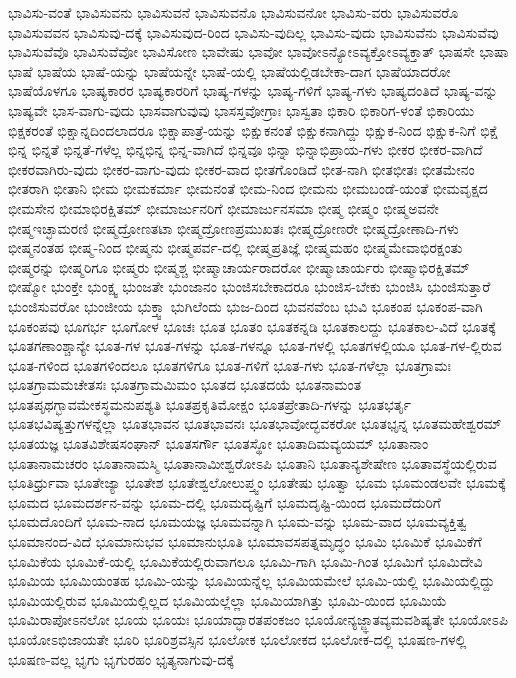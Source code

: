 {ಭಾವಿಸು-ವಂತೆ
ಭಾವಿಸುವನು
ಭಾವಿಸುವನೆ
ಭಾವಿಸುವನೊ
ಭಾವಿಸುವನೋ
ಭಾವಿಸು-ವರು
ಭಾವಿಸುವರೊ
ಭಾವಿಸುವವನ
ಭಾವಿಸುವು-ದಕ್ಕೆ
ಭಾವಿಸುವುದ-ರಿಂದ
ಭಾವಿಸು-ವುದಿಲ್ಲ
ಭಾವಿಸು-ವುದು
ಭಾವಿಸುವೆನು
ಭಾವಿಸುವೆವು
ಭಾವಿಸುವೆವೊ
ಭಾವಿಸುವೆವೋ
ಭಾವಿಸೋಣ
ಭಾವೇಷು
ಭಾವೋ
ಭಾವೋಽನ್ಯೋಽವ್ಯಕ್ತೋಽವ್ಯಕ್ತಾತ್
ಭಾಷಸೇ
ಭಾಷಾ
ಭಾಷೆ
ಭಾಷೆಯ
ಭಾಷೆ-ಯನ್ನು
ಭಾಷೆಯನ್ನೇ
ಭಾಷೆ-ಯಲ್ಲಿ
ಭಾಷೆಯಲ್ಲಿಡಬೇಕಾ-ದಾಗ
ಭಾಷೆಯಾದರೋ
ಭಾಷೆಯೊಳಗೂ
ಭಾಷ್ಯಕಾರರ
ಭಾಷ್ಯಕಾರರಿಗೆ
ಭಾಷ್ಯ-ಗಳನ್ನು
ಭಾಷ್ಯ-ಗಳಿಗೆ
ಭಾಷ್ಯ-ಗಳು
ಭಾಷ್ಯದಂತಿದೆ
ಭಾಷ್ಯ-ವನ್ನು
ಭಾಷ್ಯವೇ
ಭಾಸ-ವಾಗು-ವುದು
ಭಾಸವಾಗುವುವು
ಭಾಸಸ್ತವೋಗ್ರಾಃ
ಭಾಸ್ವತಾ
ಭಿಕಾರಿ
ಭಿಕಾರಿಗ-ಳಂತೆ
ಭಿಕಾರಿಯು
ಭಿಕ್ಷಕರಂತೆ
ಭಿಕ್ಷಾನ್ನದಿಂದಲಾದರೂ
ಭಿಕ್ಷಾಪಾತ್ರೆ-ಯನ್ನು
ಭಿಕ್ಷುಕನಂತೆ
ಭಿಕ್ಷುಕನಾಗಿದ್ದು
ಭಿಕ್ಷುಕ-ನಿಂದ
ಭಿಕ್ಷುಕ-ನಿಗೆ
ಭಿಕ್ಷೆ
ಭಿನ್ನ
ಭಿನ್ನತೆ
ಭಿನ್ನತೆ-ಗಳೆಲ್ಲ
ಭಿನ್ನಭಿನ್ನ
ಭಿನ್ನ-ವಾಗಿದೆ
ಭಿನ್ನವೂ
ಭಿನ್ನಾ
ಭಿನ್ನಾಭಿಪ್ರಾಯ-ಗಳು
ಭೀಕರ
ಭೀಕರ-ವಾಗಿದೆ
ಭೀಕರವಾಗಿರು-ವುದು
ಭೀಕರ-ವಾಗು-ವುದು
ಭೀಕರ-ವಾದ
ಭೀತಗೊಂಡಿದೆ
ಭೀತ-ನಾಗಿ
ಭೀತಭೀತಃ
ಭೀತಮೇನಂ
ಭೀತರಾಗಿ
ಭೀತಾನಿ
ಭೀಮ
ಭೀಮಕರ್ಮಾ
ಭೀಮನಂತೆ
ಭೀಮ-ನಿಂದ
ಭೀಮನು
ಭೀಮಬಂಡೆ-ಯಂತೆ
ಭೀಮವೃಕ್ಷದ
ಭೀಮಸೇನ
ಭೀಮಾಭಿರಕ್ಷಿತಮ್
ಭೀಮಾರ್ಜುನರಿಗೆ
ಭೀಮಾರ್ಜುನಸಮಾ
ಭೀಷ್ಮ
ಭೀಷ್ಮಂ
ಭೀಷ್ಮಅವನೇ
ಭೀಷ್ಮಇಚ್ಛಾಮರಣಿ
ಭೀಷ್ಮದ್ರೋಣತಟಾ
ಭೀಷ್ಮದ್ರೋಣಪ್ರಮುಖತಃ
ಭೀಷ್ಮದ್ರೋಣರೇ
ಭೀಷ್ಮದ್ರೋಣಾದಿ-ಗಳು
ಭೀಷ್ಮನಂತಹ
ಭೀಷ್ಮ-ನಿಂದ
ಭೀಷ್ಮನು
ಭೀಷ್ಮಪರ್ವ-ದಲ್ಲಿ
ಭೀಷ್ಮಪ್ರತಿಜ್ಞೆ
ಭೀಷ್ಮಮಹಂ
ಭೀಷ್ಮಮೇವಾಭಿರಕ್ಷಂತು
ಭೀಷ್ಮರನ್ನು
ಭೀಷ್ಮರಿಗೂ
ಭೀಷ್ಮರು
ಭೀಷ್ಮಶ್ಚ
ಭೀಷ್ಮಾಚಾರ್ಯರಾದರೋ
ಭೀಷ್ಮಾಚಾರ್ಯರು
ಭೀಷ್ಮಾಭಿರಕ್ಷಿತಮ್
ಭೀಷ್ಮೋ
ಭುಂಕ್ತೇ
ಭುಂಕ್ಷ್ವ
ಭುಂಜತೇ
ಭುಂಜಾನಂ
ಭುಂಜಿಸಬೇಕಾದರೂ
ಭುಂಜಿಸ-ಬೇಕು
ಭುಂಜಿಸಿ
ಭುಂಜಿಸುತ್ತಾರೆ
ಭುಂಜಿಸುವರೋ
ಭುಂಜೀಯ
ಭುಕ್ತ್ವಾ
ಭುಗಿಲೆಂದು
ಭುಜ-ದಿಂದ
ಭುವನವೆಂಬ
ಭುವಿ
ಭೂಕಂಪ
ಭೂಕಂಪ-ವಾಗಿ
ಭೂಕಂಪವು
ಭೂಗರ್ಭ
ಭೂಗೋಳ
ಭೂಚಃ
ಭೂತ
ಭೂತಂ
ಭೂತಕನ್ನಡಿ
ಭೂತಕಾಲದ್ದು
ಭೂತಕಾಲ-ವಿದೆ
ಭೂತಕ್ಕೆ
ಭೂತಗಣಾಂಶ್ಚಾನ್ಯೇ
ಭೂತ-ಗಳ
ಭೂತ-ಗಳನ್ನು
ಭೂತ-ಗಳನ್ನೂ
ಭೂತ-ಗಳಲ್ಲಿ
ಭೂತಗಳಲ್ಲಿಯೂ
ಭೂತ-ಗಳ-ಲ್ಲಿರುವ
ಭೂತ-ಗಳಿಂದ
ಭೂತಗಳಿಂದಲೂ
ಭೂತಗಳಿಗೂ
ಭೂತ-ಗಳಿಗೆ
ಭೂತ-ಗಳು
ಭೂತ-ಗಳೆಲ್ಲಾ
ಭೂತಗ್ರಾಮಃ
ಭೂತಗ್ರಾಮಮಚೇತಸಃ
ಭೂತಗ್ರಾಮಮಿಮಂ
ಭೂತದ
ಭೂತದಯೆ
ಭೂತನಾಮಂತ
ಭೂತಪೃಥಗ್ಭಾವಮೇಕಸ್ಥಮನುಪಶ್ಯತಿ
ಭೂತಪ್ರಕೃತಿಮೋಕ್ಷಂ
ಭೂತಪ್ರೇತಾದಿ-ಗಳನ್ನು
ಭೂತಭರ್ತೃ
ಭೂತಭವಿಷ್ಯತ್ತುಗಳನ್ನೆಲ್ಲಾ
ಭೂತಭಾವನ
ಭೂತಭಾವನಃ
ಭೂತಭಾವೋದ್ಭವಕರೋ
ಭೂತಭೃನ್ನ
ಭೂತಮಹೇಶ್ವರಮ್
ಭೂತಯಜ್ಞ
ಭೂತವಿಶೇಷಸಂಘಾನ್
ಭೂತಸರ್ಗೌ
ಭೂತಸ್ಥೋ
ಭೂತಾದಿಮವ್ಯಯಮ್
ಭೂತಾನಾಂ
ಭೂತಾನಾಮಚರಂ
ಭೂತಾನಾಮಸ್ಮಿ
ಭೂತಾನಾಮೀಶ್ವರೋಽಪಿ
ಭೂತಾನಿ
ಭೂತಾನ್ಯಶೇಷೇಣ
ಭೂತಾವಸ್ಥೆಯಲ್ಲಿರುವ
ಭೂತಿರ್ಧ್ರುವಾ
ಭೂತೇಜ್ಯಾ
ಭೂತೇಶ
ಭೂತೇಶ್ವಲೋಲುಪ್ತ್ವಂ
ಭೂತೇಷು
ಭೂತ್ವಾ
ಭೂಮ
ಭೂಮಂಡಲವೇ
ಭೂಮಕ್ಕೆ
ಭೂಮದ
ಭೂಮದರ್ಶನ-ವನ್ನು
ಭೂಮ-ದಲ್ಲಿ
ಭೂಮದೃಷ್ಟಿಗೆ
ಭೂಮದೃಷ್ಟಿ-ಯಿಂದ
ಭೂಮದೆದುರಿಗೆ
ಭೂಮದೊಂದಿಗೆ
ಭೂಮ-ನಾದ
ಭೂಮಯಜ್ಞ
ಭೂಮವನ್ನಾಗಿ
ಭೂಮ-ವನ್ನು
ಭೂಮ-ವಾದ
ಭೂಮವ್ಯಕ್ತಿತ್ವ
ಭೂಮಾನಂದ-ವಿದೆ
ಭೂಮಾನುಭವ
ಭೂಮಾನುಭೂತಿ
ಭೂಮಾವಸಪತ್ನಮೃದ್ಧಂ
ಭೂಮಿ
ಭೂಮಿಕೆ
ಭೂಮಿಕೆಗೆ
ಭೂಮಿಕೆಯ
ಭೂಮಿಕೆ-ಯಲ್ಲಿ
ಭೂಮಿಕೆಯಲ್ಲಿರುವಾಗಲೂ
ಭೂಮಿ-ಗಾಗಿ
ಭೂಮಿ-ಗಿಂತ
ಭೂಮಿಗೆ
ಭೂಮಿದೇವಿ
ಭೂಮಿಯ
ಭೂಮಿಯಂತಹ
ಭೂಮಿ-ಯನ್ನು
ಭೂಮಿಯನ್ನೆಲ್ಲ
ಭೂಮಿಯಮೇಲೆ
ಭೂಮಿ-ಯಲ್ಲಿ
ಭೂಮಿಯಲ್ಲಿದ್ದು
ಭೂಮಿಯಲ್ಲಿರುವ
ಭೂಮಿಯಲ್ಲಿಲ್ಲದ
ಭೂಮಿಯಲ್ಲೆಲ್ಲಾ
ಭೂಮಿಯಾಗಿತ್ತು
ಭೂಮಿ-ಯಿಂದ
ಭೂಮಿಯೆ
ಭೂಮಿರಾಪೋಽನಲೋ
ಭೂಯ
ಭೂಯಃ
ಭೂಯಾದ್ಭಾರತಪಂಕಜಂ
ಭೂಯೋನ್ಯಜ್ಜ್ಞಾತವ್ಯಮವಶಿಷ್ಯತೇ
ಭೂಯೋಽಪಿ
ಭೂಯೋಽಭಿಜಾಯತೇ
ಭೂರಿ
ಭೂರಿಶ್ರವಸ್ಸಿನ
ಭೂಲೋಕ
ಭೂಲೋಕದ
ಭೂಲೋಕ-ದಲ್ಲಿ
ಭೂಷಣ-ಗಳಲ್ಲಿ
ಭೂಷಣ-ವಲ್ಲ
ಭೃಗು
ಭೃಗುರಹಂ
ಭೃತ್ಯನಾಗುವು-ದಕ್ಕೆ
}
